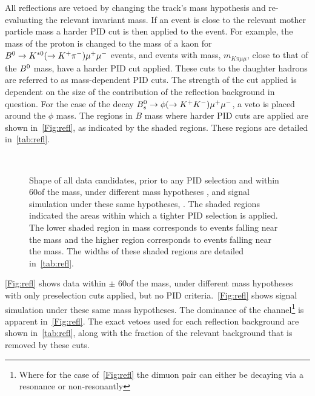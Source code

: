All reflections are vetoed by changing the track's mass hypothesis and re-evaluating the relevant invariant mass. If an event is close to the relevant mother particle mass a harder PID cut is then applied to the event. For example, the mass of the proton is changed to the mass of a kaon for ${{B}^0}\rightarrow{\ensuremath{{K}^{*0}}}(\rightarrow {\ensuremath{{K}^+}}{\ensuremath{{\pi}^-}}){\mu^+\mu^-}$ events, and events with mass, $m_{K\pi\mu\mu}$, close to that of the ${{B}^0}$ mass, have a harder PID cut applied. These cuts to the daughter hadrons are referred to as mass-dependent PID cuts. The strength of the cut applied is dependent on the size of the contribution of the reflection background in question. For the case of the decay ${{B}^0_{s}}\rightarrow\phi(\rightarrow{\ensuremath{{K}^+}}{\ensuremath{{K}^-}}){\mu^+\mu^-}$, a veto is placed around the $\phi$ mass. The regions in $B$ mass where harder PID cuts are applied are shown in~\autoref{Fig:refl}, as indicated by the shaded regions.  These regions are detailed in~\autoref{tab:refl}.
\begin{figure}[h!]
  \def\nh{0.7\textwidth}
  \centering
   \\
  \textwidth
  \caption{Shape of all data candidates, prior to any PID selection and within 60\mevcc of the \Lb mass, under different mass hypotheses \protect{}, and \Lbpi signal simulation under these same hypotheses, \protect{}. The shaded regions indicated the areas within which a tighter PID selection is applied. The lower shaded region in mass corresponds to events falling near the \Bd mass and the higher region corresponds to events falling near the \Bs mass. The widths of these shaded regions are detailed in~\autoref{tab:refl}.}
  \label{Fig:refl}
\end{figure}
\autoref{Fig:refl}\protect{} shows data within $\pm$ 60\mevcc of the \Lb mass, under different mass hypotheses with only preselection cuts applied, but no PID criteria.~\autoref{Fig:refl}\protect{} shows \Lbpi signal simulation under these same mass hypotheses. The dominance of the \Bd\to\Kstarz\mumu channel\footnote{Where for the case of~\autoref{Fig:refl}\protect{} the dimuon pair can either be decaying via a \jpsi resonance or non-resonantly} is apparent in~\autoref{Fig:refl}\protect{}. The exact vetoes used for each reflection background are shown in~\autoref{tab:refl}, along with the fraction of the relevant background that is removed by these cuts.

